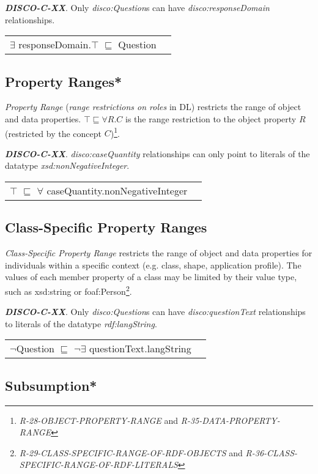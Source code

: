 \documentclass{elsart3p}    %
\newenvironment{DL}{
  \vspace{0cm}
  \begin{tabular}{l l}

}{
  \end{tabular}
}
\begin{document}
\textbf{{\em DISCO-C-XX}}. 
Only {\em disco:Question}s can have {\em disco:responseDomain} relationships.

\begin{DL}
$\exists$ responseDomain.$\top$ $\sqsubseteq$ Question 
\end{DL}

\subsection{Property Ranges*}

{\em Property Range} ({\em range restrictions on roles} in DL) restricts the range of object and data properties.
$\top \sqsubseteq \forall R . C$ is the range restriction to the object property $R$ (restricted by the concept $C$)\footnote{{\em R-28-OBJECT-PROPERTY-RANGE} and {\em R-35-DATA-PROPERTY-RANGE}}. 

\textbf{{\em DISCO-C-XX}}. 
{\em disco:caseQuantity} relationships can only point to literals of the datatype {\em xsd:nonNegativeInteger}.

\begin{DL}
$\top$ $\sqsubseteq$ $\forall$ caseQuantity.nonNegativeInteger \\
\end{DL}

\subsection{Class-Specific Property Ranges}		

{\em Class-Specific Property Range} restricts the range of object and data properties for individuals within a specific context (e.g. class, shape, application profile).
The values of each member property of a class may be limited by their value type, such as xsd:string or foaf:Person\footnote{{\em R-29-CLASS-SPECIFIC-RANGE-OF-RDF-OBJECTS} and {\em R-36-CLASS-SPECIFIC-RANGE-OF-RDF-LITERALS}}. 

\textbf{{\em DISCO-C-XX}}. 
Only {\em disco:Question}s can have {\em disco:questionText} relationships to literals of the datatype {\em rdf:langString}.

\begin{DL}
$\neg$Question $\sqsubseteq$ $\neg\exists$ questionText.langString
\end{DL}

\subsection{Subsumption*}
\end{document}
